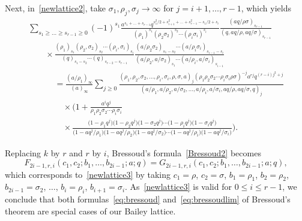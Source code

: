 \documentclass[pdftex]{sigma}
\numberwithin{equation}{section}
\begin{document}
Next, in~\eqref{newlattice2}, take $\sigma_1,\rho_j,\sigma_j\to\infty$ for $j=i+1,\dots,r-1$, which yields
\begin{gather}
\sum_{s_1\geq\dots\geq s_{r-1}\geq0}(-1)^{s_1}\frac{a^{s_1+\dots+s_{r-1}}q^{s_1^2/2+s_{i+1}^2+\dots+s_{r-1}^2-s_1/2+s_i}}{(\rho_1)^{s_1}(\rho_{2}\sigma_{2})^{s_{2}} \cdots(\rho_{i}\sigma_{i})^{s_{i}}}
\frac{(aq/\rho\sigma)_{s_{r-1}}}{(q,aq/\rho,aq/\sigma)_{s_{r-1}}}\nonumber\\
\qquad{}\times\frac{(\rho_1)_{s_1}(\rho_{2},\sigma_{2})_{s_{2}}\cdots(\rho_{i},\sigma_{i})_{s_{i}}}{(q)_{s_1-s_2} \cdots(q)_{s_{r-2}-s_{r-1}}}\frac{(a/\rho_2\sigma_2)_{s_1-s_2}
\cdots(a/\rho_i\sigma_i)_{s_{i-1}-s_i}}{(a/\rho_2,a/\sigma_2)_{s_1}\cdots(a/\rho_i,a/\sigma_i)_{s_{i-1}}}\nonumber\\
\phantom{\qquad{}\times}{}=\frac{(a/\rho_1)_\infty}{(a)_\infty}\sum_{j\geq0}\frac{(\rho_1,\rho_2,\sigma_2,\dots,\rho_{i},\sigma_{i},\rho,\sigma,a)_j
(\rho_1\rho_2\sigma_2\cdots\rho_{i}\sigma_{i}\rho\sigma)^{-j}a^{rj}q^{(r-i)j^2+j}}{(a/\rho_1,a/\rho_2,a/\sigma_2, \dots,a/\rho_i,a/\sigma_i,aq/\rho,aq/\sigma,q)_j}\nonumber\\
\phantom{\qquad{}\times=}{}\times
\bigg(1+\frac{a^{i}q^{j}}{\rho_1\rho_2\sigma_2\cdots\rho_i\sigma_i}\nonumber\\
\phantom{\qquad{}\times=}{}\times\frac{\bigl(1-\rho_1q^j\bigr)\bigl(1-\rho_2q^j\bigr)\bigl(1-\sigma_2q^j\bigr)\cdots\bigl(1-\rho_iq^j\bigr)
\bigl(1-\sigma_iq^j\bigr)}{\bigl(1-aq^j/\rho_1\bigr)
\bigl(1-aq^j/\rho_2\bigr)\bigl(1-aq^j/\sigma_2\bigr)\cdots\bigl(1-aq^j/\rho_i\bigr)\bigl(1-aq^j/\sigma_i\bigr)}\bigg).\label{newlattice3}
\end{gather}

Replacing $k$ by $r$ and $r$ by $i$, Bressoud's formula~\eqref{Bressoud2} becomes
\begin{equation*}
F_{2i-1,r,i}(c_1,c_2;b_1,\dots,b_{2i-1};a;q)=G_{2i-1,r,i}(c_1,c_2;b_1,\dots,b_{2i-1};a;q),
\end{equation*}
which corresponds to~\eqref{newlattice3} by taking $c_1=\rho$, $c_2=\sigma$, $b_1=\rho_1$, $b_2=\rho_2$, $b_{2i-1}=\sigma_2$, $\dots$, $b_{i}=\rho_i$, $b_{i+1}=\sigma_i$. As~\eqref{newlattice3} is valid for $0\leq i\leq r-1$, we conclude that both formulas~\eqref{eq:bressoud} and~\eqref{eq:bressoudlim} of Bressoud's theorem are special cases of our Bailey lattice.
\end{document}
